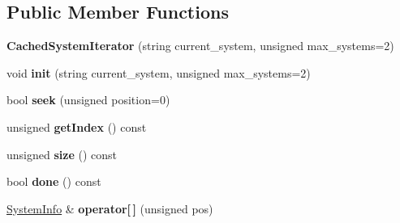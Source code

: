 \subsection*{Public Member Functions}
\begin{DoxyCompactItemize}
\item 
{\bfseries Cached\+System\+Iterator} (string current\+\_\+system, unsigned max\+\_\+systems=2)\hypertarget{classNavigationSystem_1_1CachedSystemIterator_a9458ef3440e2ed9e25fb1f4adba167f5}{}\label{classNavigationSystem_1_1CachedSystemIterator_a9458ef3440e2ed9e25fb1f4adba167f5}

\item 
void {\bfseries init} (string current\+\_\+system, unsigned max\+\_\+systems=2)\hypertarget{classNavigationSystem_1_1CachedSystemIterator_a0a5931fea04c89eecc14235810951e4e}{}\label{classNavigationSystem_1_1CachedSystemIterator_a0a5931fea04c89eecc14235810951e4e}

\item 
bool {\bfseries seek} (unsigned position=0)\hypertarget{classNavigationSystem_1_1CachedSystemIterator_a6f0518a61344777fb1520a6c3e424672}{}\label{classNavigationSystem_1_1CachedSystemIterator_a6f0518a61344777fb1520a6c3e424672}

\item 
unsigned {\bfseries get\+Index} () const \hypertarget{classNavigationSystem_1_1CachedSystemIterator_ab71446cbbb65c98fe0458161c338c399}{}\label{classNavigationSystem_1_1CachedSystemIterator_ab71446cbbb65c98fe0458161c338c399}

\item 
unsigned {\bfseries size} () const \hypertarget{classNavigationSystem_1_1CachedSystemIterator_ae51f8ed737f8d1ff11cf9ef24a3b628d}{}\label{classNavigationSystem_1_1CachedSystemIterator_ae51f8ed737f8d1ff11cf9ef24a3b628d}

\item 
bool {\bfseries done} () const \hypertarget{classNavigationSystem_1_1CachedSystemIterator_ad71c5eab794bf29ce5c0f87d8141e502}{}\label{classNavigationSystem_1_1CachedSystemIterator_ad71c5eab794bf29ce5c0f87d8141e502}

\item 
\hyperlink{structNavigationSystem_1_1CachedSystemIterator_1_1SystemInfo}{System\+Info} \& {\bfseries operator\mbox{[}$\,$\mbox{]}} (unsigned pos)\hypertarget{classNavigationSystem_1_1CachedSystemIterator_a0224ed728222a1a6b8d24516f80b9d98}{}\label{classNavigationSystem_1_1CachedSystemIterator_a0224ed728222a1a6b8d24516f80b9d98}


\end{DoxyCompactItemize}
